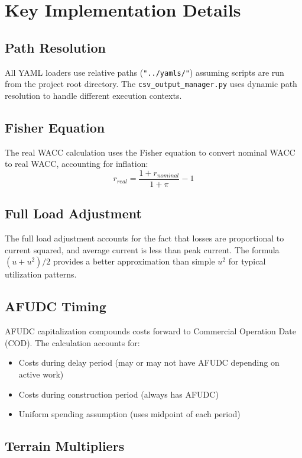\documentclass[ctcc_full_documentation.tex]{subfiles}
\begin{document}
\section{Key Implementation Details}

\subsection{Path Resolution}

All YAML loaders use relative paths (\texttt{"../yamls/"}) assuming scripts are run from the project root directory. The \texttt{csv\_output\_manager.py} uses dynamic path resolution to handle different execution contexts.

\subsection{Fisher Equation}

The real WACC calculation uses the Fisher equation to convert nominal WACC to real WACC, accounting for inflation:
\[
r_{real} = \frac{1 + r_{nominal}}{1 + \pi} - 1
\]

\subsection{Full Load Adjustment}

The full load adjustment accounts for the fact that losses are proportional to current squared, and average current is less than peak current. The formula $(u + u^2)/2$ provides a better approximation than simple $u^2$ for typical utilization patterns.

\subsection{AFUDC Timing}

AFUDC capitalization compounds costs forward to Commercial Operation Date (COD). The calculation accounts for:
\begin{itemize}
    \item Costs during delay period (may or may not have AFUDC depending on active work)
    \item Costs during construction period (always has AFUDC)
    \item Uniform spending assumption (uses midpoint of each period)
\end{itemize}

\subsection{Terrain Multipliers}
\end{document}

